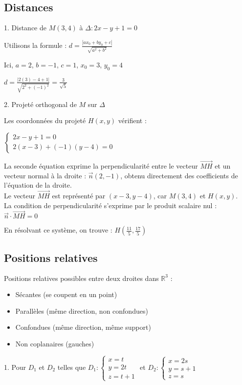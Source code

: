 \documentclass[10pt,a4paper]{article}
\begin{document}
\subsection*{Distances}

1. Distance de $M(3, 4)$ à $\Delta : 2x - y + 1 = 0$

   Utilisons la formule : $d = \frac{|ax_0 + by_0 + c|}{\sqrt{a^2 + b^2}}$

   Ici, $a=2$, $b=-1$, $c=1$, $x_0=3$, $y_0=4$

   $d = \frac{|2(3) - 4 + 1|}{\sqrt{2^2 + (-1)^2}} = \frac{3}{\sqrt{5}}$

2. Projeté orthogonal de $M$ sur $\Delta$

   Les coordonnées du projeté $H(x,y)$ vérifient :

   $\begin{cases} 2x - y + 1 = 0 \\ 2(x-3) + (-1)(y-4) = 0 \end{cases}$

   La seconde équation exprime la perpendicularité entre le vecteur $\vec{MH}$ et un vecteur normal
   à la droite : $\vec{n}(2,-1)$, obtenu directement des coefficients de l'équation de la droite.\\
   Le vecteur $\vec{MH}$ est représenté par $(x-3, y-4)$, car $M(3,4)$ et $H(x,y)$. \\
   La condition de perpendicularité s'exprime par le produit scalaire nul :
   $\vec{n} \cdot \vec{MH} = 0$

   En résolvant ce système, on trouve :
   $H(\frac{11}{5}, \frac{17}{5})$

\subsection*{Positions relatives}

Positions relatives possibles entre deux droites dans $\mathbb{R}^3$ :
\begin{itemize}
    \item Sécantes (se coupent en un point)
    \item Parallèles (même direction, non confondues)
    \item Confondues (même direction, même support)
    \item Non coplanaires (gauches)\\
\end{itemize}

1. Pour $D_1$ et $D_2$ telles que
   $D_1 : \begin{cases} x = t \\ y = 2t \\ z = t+1 \end{cases}$ et
   $D_2 : \begin{cases} x = 2s \\ y = s+1 \\ z = s \end{cases}$
\end{document}
